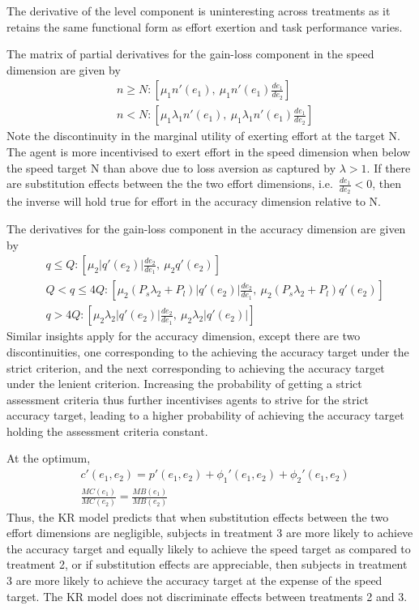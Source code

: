 \documentclass[
  12,
  letterpaper,
  DIV=11,
  numbers=noendperiod]{scrartcl}
\begin{document}
The derivative of the level component is uninteresting across treatments
as it retains the same functional form as effort exertion and task
performance varies.

The matrix of partial derivatives for the gain-loss component in the
speed dimension are given by \[
\begin{aligned}
& n \geq N: [\mu_1 n'(e_1), \: \mu_1 n'(e_1) \frac {de_1}{de_2}] \nonumber \\
& n < N: [\mu_1 \lambda_1 n'(e_1), \: \mu_1 \lambda_1 n'(e_1) \frac {de_1}{de_2}] \nonumber
\end{aligned}
\] Note the discontinuity in the marginal utility of exerting effort at
the target N. The agent is more incentivised to exert effort in the
speed dimension when below the speed target N than above due to loss
aversion as captured by \(\lambda>1\). If there are substitution effects
between the the two effort dimensions, i.e.~\(\frac {de_1}{de_2}<0\),
then the inverse will hold true for effort in the accuracy dimension
relative to N.

The derivatives for the gain-loss component in the accuracy dimension
are given by \[
\begin{aligned}
& q \leq Q: [\mu_2 |q'(e_2)| \frac {de_2}{de_1}, \: \mu_2 q'(e_2)] \nonumber \\
& Q < q \leq 4Q: [\mu_2 (P_s \lambda_2 + P_l) |q'(e_2)| \frac {de_2}{de_1}, \: \mu_2 (P_s \lambda_2 + P_l) q'(e_2)] \nonumber \\
& q > 4Q: [\mu_2 \lambda_2 |q'(e_2)| \frac {de_2}{de_1}, \: \mu_2 \lambda_2 |q'(e_2)|] \nonumber
\end{aligned}
\] Similar insights apply for the accuracy dimension, except there are
two discontinuities, one corresponding to the achieving the accuracy
target under the strict criterion, and the next corresponding to
achieving the accuracy target under the lenient criterion. Increasing
the probability of getting a strict assessment criteria thus further
incentivises agents to strive for the strict accuracy target, leading to
a higher probability of achieving the accuracy target holding the
assessment criteria constant.

At the optimum, \[
\begin{aligned}
& c'(e_1, e_2) = p'(e_1, e_2) + \phi_1'(e_1, e_2) + \phi_2'(e_1, e_2) \nonumber \\
& \frac {MC(e_1)}{MC(e_2)} = \frac {MB(e_1)}{MB(e_2)} \nonumber
\end{aligned}
\] Thus, the KR model predicts that when substitution effects between
the two effort dimensions are negligible, subjects in treatment 3 are
more likely to achieve the accuracy target and equally likely to achieve
the speed target as compared to treatment 2, or if substitution effects
are appreciable, then subjects in treatment 3 are more likely to achieve
the accuracy target at the expense of the speed target. The KR model
does not discriminate effects between treatments 2 and 3.
\end{document}
